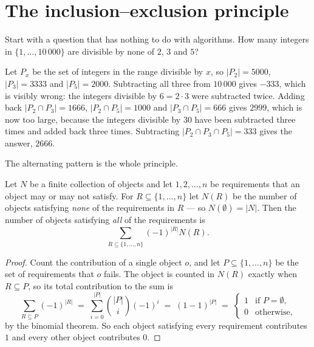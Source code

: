 \section{The inclusion--exclusion principle}
\label{sec:inclusion-exclusion}

Start with a question that has nothing to do with algorithms. How many integers
in $\{1, \ldots, 10\,000\}$ are divisible by none of $2$, $3$ and $5$?

Let $P_x$ be the set of integers in the range divisible by $x$, so
$|P_2| = 5000$, $|P_3| = 3333$ and $|P_5| = 2000$. Subtracting all three from
$10\,000$ gives $-333$, which is visibly wrong: the integers divisible by
$6 = 2 \cdot 3$ were subtracted twice. Adding back
$|P_2 \cap P_3| = 1666$, $|P_2 \cap P_5| = 1000$ and $|P_3 \cap P_5| = 666$
gives $2999$, which is now too large, because the integers divisible by $30$
have been subtracted three times and added back three times. Subtracting
$|P_2 \cap P_3 \cap P_5| = 333$ gives the answer, $2666$.

The alternating pattern is the whole principle.

\begin{theorem}\label{thm:inclusion-exclusion}
Let $N$ be a finite collection of objects and let $1, 2, \ldots, n$ be
requirements that an object may or may not satisfy. For $R \subseteq
\{1,\ldots,n\}$ let $N(R)$ be the number of objects satisfying \emph{none} of
the requirements in $R$ --- so $N(\emptyset) = |N|$. Then the number of objects
satisfying \emph{all} of the requirements is
\[ \sum_{R \subseteq \{1,\ldots,n\}} (-1)^{|R|} N(R). \]
\end{theorem}

\begin{proof}
Count the contribution of a single object $o$, and let
$P \subseteq \{1,\ldots,n\}$ be the set of requirements that $o$ fails.
The object is counted in $N(R)$ exactly when $R \subseteq P$, so its total
contribution to the sum is
\[ \sum_{R \subseteq P} (-1)^{|R|}
   \;=\; \sum_{i=0}^{|P|} \binom{|P|}{i} (-1)^i
   \;=\; (1-1)^{|P|}
   \;=\; \begin{cases} 1 & \text{if } P = \emptyset, \\
                       0 & \text{otherwise,}\end{cases} \]
by the binomial theorem. So each object satisfying every requirement
contributes $1$ and every other object contributes $0$.
\end{proof}

